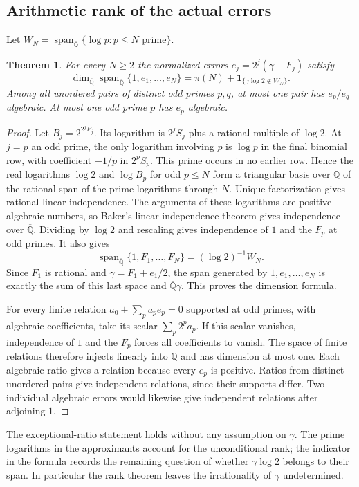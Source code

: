\documentclass[11pt,a4paper,oneside,openany]{report}
\newtheorem{theorem}{Theorem}[section]
\theoremstyle{remark}\newtheorem{remark}[theorem]{Remark}
\numberwithin{equation}{section}
\begin{document}
\subsection{Arithmetic rank of the actual errors}
Let $W_N=\operatorname{span}_{\overline{\mathbb Q}}\{\log p:
p\le N\text{ prime}\}$.
\begin{theorem}\label{ch2:st:prime-errors}
For every $N\ge2$ the normalized errors $e_j=2^j(\gamma-F_j)$ satisfy
\[
 \dim_{\overline{\mathbb Q}}
    \operatorname{span}_{\overline{\mathbb Q}}\{1,e_1,\ldots,e_N\}
 =\pi(N)+\mathbf{1}_{\{\gamma\log 2\notin W_N\}} .
\]
Among all unordered pairs of distinct odd primes $p,q$, at most one pair
has $e_p/e_q$ algebraic. At most one odd prime $p$ has $e_p$ algebraic.
\end{theorem}
\begin{proof}
Let $B_j=2^{2^jF_j}$. Its logarithm is $2^j S_j$ plus a rational
multiple of $\log 2$. At $j=p$ an odd prime, the only logarithm involving
$p$ is $\log p$ in the final binomial row, with coefficient $-1/p$ in
$2^p S_p$. This prime occurs in no earlier row. Hence the real logarithms
$\log2$ and $\log B_p$ for odd $p\le N$ form a triangular basis over
$\mathbb Q$ of the rational span of the prime logarithms through $N$.
Unique factorization gives rational linear independence. The arguments
of these logarithms are positive algebraic numbers, so Baker's linear
independence theorem \cite{baker} gives independence over $\overline{\mathbb Q}$.
Dividing by $\log 2$ and rescaling gives independence of $1$ and the
$F_p$ at odd primes. It also gives
\[
 \operatorname{span}_{\overline{\mathbb Q}}\{1,F_1,\ldots,F_N\}
      =(\log2)^{-1} W_N .
\]
Since $F_1$ is rational and $\gamma=F_1+e_1/2$, the span generated by
$1,e_1,\ldots,e_N$ is exactly the sum of this last space and
$\overline{\mathbb Q}\gamma$. This proves the dimension formula.

For every finite relation $a_0+\sum_pa_p e_p=0$ supported at odd
primes, with algebraic coefficients, take its scalar $\sum_p2^p a_p$.
If this scalar vanishes, independence of $1$ and the $F_p$ forces all
coefficients to vanish. The space of finite relations therefore injects
linearly into $\overline{\mathbb Q}$ and has dimension at most one.
Each algebraic ratio gives a relation because every $e_p$ is positive.
Ratios from distinct unordered pairs give independent relations, since
their supports differ. Two individual algebraic errors would likewise give
independent relations after adjoining $1$.
\end{proof}
The exceptional-ratio statement holds without any assumption on
$\gamma$. The prime logarithms in the approximants account for the
unconditional rank; the indicator in the formula records the remaining
question of whether $\gamma\log2$ belongs to their span. In particular the
rank theorem leaves the irrationality of $\gamma$ undetermined.
\end{document}

